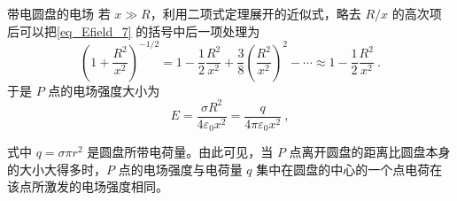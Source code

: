 \begin{example}{带电圆盘的电场}
若 $x\gg R$，利用二项式定理展开的近似式，略去 $R/x$ 的高次项后可以把\autoref{eq_Efield_7} 的括号中后一项处理为
\begin{equation}
\left(1+\frac{R^{2}}{x^{2}}\right)^{-1 / 2}=1-\frac{1}{2} \frac{R^{2}}{x^{2}}+\frac{3}{8}\left(\frac{R^{2}}{x^{2}}\right)^{2}-\cdots \approx 1-\frac{1}{2} \frac{R^{2}}{x^{2}}~.
\end{equation}
于是 $P$ 点的电场强度大小为
\begin{equation}
E=\frac{\sigma R^{2}}{4 \varepsilon_{0} x^{2}} =\frac{q}{4 \pi \varepsilon_{0} x^{2}} ~,
\end{equation}

式中 $q=\sigma\pi r^2$ 是圆盘所带电荷量。由此可见，当 $P$ 点离开圆盘的距离比圆盘本身的大小大得多时，$ P$ 点的电场强度与电荷量 $q$ 集中在圆盘的中心的一个点电荷在该点所激发的电场强度相同。
\end{example}

